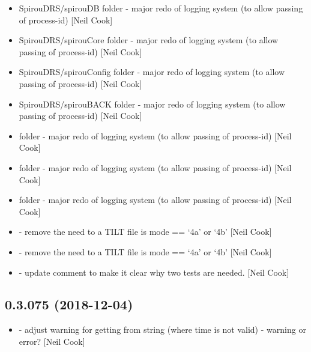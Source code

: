\documentclass[a4paper,10pt,english]{report}
\begin{document}
\begin{itemize}
\item {} 
SpirouDRS/spirouDB folder - major redo of logging system (to allow
passing of process-id) {[}Neil Cook{]}

\item {} 
SpirouDRS/spirouCore folder - major redo of logging system (to allow
passing of process-id) {[}Neil Cook{]}

\item {} 
SpirouDRS/spirouConfig folder - major redo of logging system (to allow
passing of process-id) {[}Neil Cook{]}

\item {} 
SpirouDRS/spirouBACK folder - major redo of logging system (to allow
passing of process-id) {[}Neil Cook{]}

\item {} 
 folder - major redo of logging system (to allow
passing of process-id) {[}Neil Cook{]}

\item {} 
 folder - major redo of logging system (to allow passing
of process-id) {[}Neil Cook{]}

\item {} 
 folder - major redo of logging system (to allow passing
of process-id) {[}Neil Cook{]}

\item {} 
 - remove the need to a TILT file is mode ==
‘4a’ or ‘4b’ {[}Neil Cook{]}

\item {} 
 - remove the need to a TILT file is mode ==
‘4a’ or ‘4b’ {[}Neil Cook{]}

\item {} 
 - update comment to make it clear why two tests
are needed. {[}Neil Cook{]}

\end{itemize}


\subsection{0.3.075 (2018-12-04)}
\label{\detokenize{misc/changelog:id247}}\begin{itemize}
\item {} 
 - adjust warning for getting  from string
(where time is not valid) - warning or error? {[}Neil Cook{]}

\end{itemize}
\end{document}
